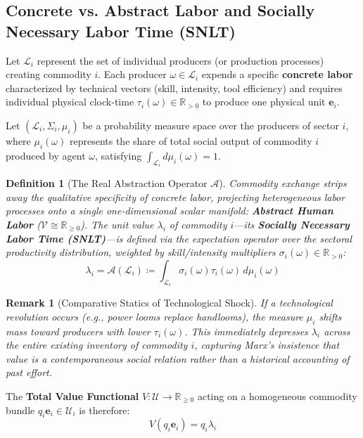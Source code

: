 \documentclass[11pt,a4paper]{article}
\newtheorem{definition}{Definition}[section]
\newtheorem{remark}{Remark}[section]
\begin{document}
\subsection{Concrete vs. Abstract Labor and Socially Necessary Labor Time (SNLT)}

Let $\mathcal{L}_i$ represent the set of individual producers (or production processes) creating commodity $i$. Each producer $\omega \in \mathcal{L}_i$ expends a specific \textbf{concrete labor} characterized by technical vectors (skill, intensity, tool efficiency) and requires individual physical clock-time $\tau_i(\omega) \in \mathbb{R}_{>0}$ to produce one physical unit $\mathbf{e}_i$.

Let $(\mathcal{L}_i, \Sigma_i, \mu_i)$ be a probability measure space over the producers of sector $i$, where $\mu_i(\omega)$ represents the share of total social output of commodity $i$ produced by agent $\omega$, satisfying $\int_{\mathcal{L}_i} d\mu_i(\omega) = 1$.

\begin{definition}[The Real Abstraction Operator $\mathcal{A}$]
Commodity exchange strips away the qualitative specificity of concrete labor, projecting heterogeneous labor processes onto a single one-dimensional scalar manifold: \textbf{Abstract Human Labor} ($\mathcal{V} \cong \mathbb{R}_{\ge 0}$). The unit value $\lambda_i$ of commodity $i$---its \textbf{Socially Necessary Labor Time (SNLT)}---is defined via the expectation operator over the sectoral productivity distribution, weighted by skill/intensity multipliers $\sigma_i(\omega) \in \mathbb{R}_{>0}$:
\begin{equation}
    \lambda_i = \mathcal{A}(\mathcal{L}_i) \coloneqq \int_{\mathcal{L}_i} \sigma_i(\omega) \tau_i(\omega) \, d\mu_i(\omega)
\end{equation}
\end{definition}

\begin{remark}[Comparative Statics of Technological Shock]
If a technological revolution occurs (e.g., power looms replace handlooms), the measure $\mu_i$ shifts mass toward producers with lower $\tau_i(\omega)$. This immediately depresses $\lambda_i$ across the entire existing inventory of commodity $i$, capturing Marx's insistence that value is a contemporaneous social relation rather than a historical accounting of past effort.
\end{remark}

The \textbf{Total Value Functional} $V: \mathcal{U} \to \mathbb{R}_{\ge 0}$ acting on a homogeneous commodity bundle $q_i \mathbf{e}_i \in \mathcal{U}_i$ is therefore:
\begin{equation}
    V(q_i \mathbf{e}_i) = q_i \lambda_i
\end{equation}
\end{document}
